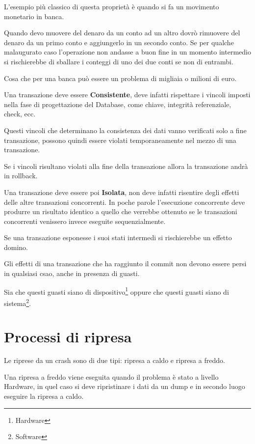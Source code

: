 \begin{exmp}
    L'esempio più classico di questa proprietà è quando si fa un movimento monetario in banca.
    
    Quando devo muovere del denaro da un conto ad un altro dovrò rimuovere del denaro da un primo conto e aggiungerlo in un secondo conto. Se per qualche malaugurato caso l'operazione non andasse a buon fine in un momento intermedio si rischierebbe di sballare i conteggi di uno dei due conti se non di entrambi.
    
    Cosa che per una banca può essere un problema di migliaia o milioni di euro.
\end{exmp}

Una transazione deve essere \textbf{Consistente}, deve infatti rispettare i vincoli imposti nella fase di progettazione del Database, come chiave, integrità referenziale, check, ecc.

Questi vincoli che determinano la consistenza dei dati vanno verificati solo a fine transazione, possono quindi essere violati temporaneamente nel mezzo di una transazione.

Se i vincoli risultano violati alla fine della transazione allora la transazione andrà in rollback.

Una transazione deve essere poi \textbf{Isolata}, non deve infatti risentire degli effetti delle altre transazioni concorrenti. In poche parole l'esecuzione concorrente deve produrre un risultato identico a quello che verrebbe ottenuto se le transazioni concorrenti venissero invece eseguite sequenzialmente.

Se una transazione esponesse i suoi stati intermedi si rischierebbe un effetto domino.

Gli effetti di una transazione che ha raggiunto il commit non devono essere persi in qualsiasi csao, anche in presenza di guasti.

Sia che questi guasti siano di dispositivo\footnote{Hardware} oppure che questi guasti siano di sistema\footnote{Software}.

\section{Processi di ripresa}

Le riprese da un crash sono di due tipi: ripresa a caldo e ripresa a freddo.

Una ripresa a freddo viene eseguita quando il problema è stato a livello Hardware, in quel caso si deve ripristinare i dati da un dump e in secondo luogo eseguire la ripresa a caldo.

